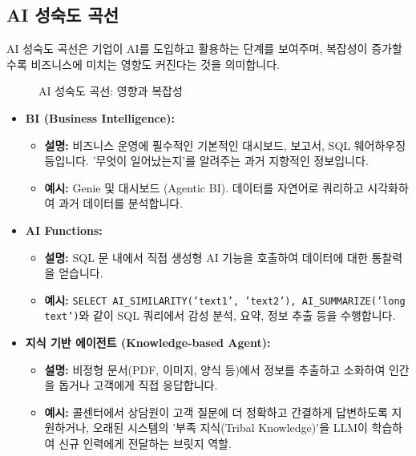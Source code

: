 \documentclass[11pt,a4paper]{article}
\theoremstyle{definition}
\begin{document}
\subsection{AI 성숙도 곡선}

AI 성숙도 곡선은 기업이 AI를 도입하고 활용하는 단계를 보여주며, 복잡성이 증가할수록 비즈니스에 미치는 영향도 커진다는 것을 의미합니다.

\begin{figure}[h!]
    \centering
    \caption{AI 성숙도 곡선: 영향과 복잡성}
    \label{fig:ai_maturity_curve}
\end{figure}

\begin{itemize}
    \item \textbf{BI (Business Intelligence):}
    \begin{itemize}
        \item \textbf{설명:} 비즈니스 운영에 필수적인 기본적인 대시보드, 보고서, SQL 웨어하우징 등입니다. '무엇이 일어났는지'를 알려주는 과거 지향적인 정보입니다.
        \item \textbf{예시:} Genie 및 대시보드 (Agentic BI). 데이터를 자연어로 쿼리하고 시각화하여 과거 데이터를 분석합니다.
    \end{itemize}

    \item \textbf{AI Functions:}
    \begin{itemize}
        \item \textbf{설명:} SQL 문 내에서 직접 생성형 AI 기능을 호출하여 데이터에 대한 통찰력을 얻습니다.
        \item \textbf{예시:} \texttt{SELECT AI_SIMILARITY('text1', 'text2'), AI_SUMMARIZE('long text')}와 같이 SQL 쿼리에서 감성 분석, 요약, 정보 추출 등을 수행합니다.
    \end{itemize}

    \item \textbf{지식 기반 에이전트 (Knowledge-based Agent):}
    \begin{itemize}
        \item \textbf{설명:} 비정형 문서(PDF, 이미지, 양식 등)에서 정보를 추출하고 소화하여 인간을 돕거나 고객에게 직접 응답합니다.
        \item \textbf{예시:} 콜센터에서 상담원이 고객 질문에 더 정확하고 간결하게 답변하도록 지원하거나, 오래된 시스템의 '부족 지식(Tribal Knowledge)'을 LLM이 학습하여 신규 인력에게 전달하는 브릿지 역할.
    \end{itemize}


\end{itemize}
\end{document}
